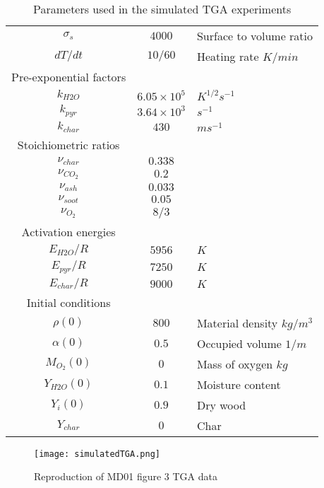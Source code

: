 \documentclass[reqno]{amsart}
\begin{document}
\newpage

\begin{table}
\centering
\begin{tabular}{c c l}
\hline
  $\sigma_s$ & $4000$ & Surface to volume ratio \\
  $dT/dt$ & $10/60$ & Heating rate $K/min$\\
\hline
  Pre-exponential factors & &\\ 
  $k_{H2O}$ & $6.05\times 10^5$ & $K^{1/2}s^{-1}$\\
  $k_{pyr}$ & $3.64\times 10^3$ & $s^{-1}$ \\
  $k_{char}$& $430$ & $ms^{-1}$ \\
%
\hline
  Stoichiometric ratios & &\\
  $\nu_{char}$ & $0.338$& \\ %
  $\nu_{CO_2}$ & $0.2$&\\ %
  $\nu_{ash}$ & $0.033$&\\ %
  $\nu_{soot}$ & $0.05$&\\ %
  $\nu_{O_2}$ & $8/3$&\\ %
%
\hline
 Activation energies & & \\
  $E_{H2O}/R$ & $5956$ & $K$ \\
  $E_{pyr}/R$ & $7250$ & $K$ \\
  $E_{char}/R$& $9000$ & $K$ \\
%
\hline
   Initial conditions & & \\
   $\rho(0)$ & $800$ & Material density $kg/m^3$\\
   $\alpha(0)$ & $0.5$ & Occupied volume $1/m$\\
   $M_{O_2}(0)$ & $0$ & Mass of oxygen $kg$ \\
   $Y_{H2O}(0)$ & $0.1$ & Moisture content\\
   $Y_{i}(0)$ & $0.9$ & Dry wood\\
   $Y_{char}$ & $0$ & Char \\
\hline
\end{tabular}
\caption{Parameters used in the simulated TGA experiments}
\label{tab:parameters}
\end{table}

\begin{figure}
\centering
  \texttt{[image: simulatedTGA.png]}
\caption{Reproduction of MD01 figure 3 TGA data}
\label{fig:simulatedTGA}
\end{figure}
\end{document}
